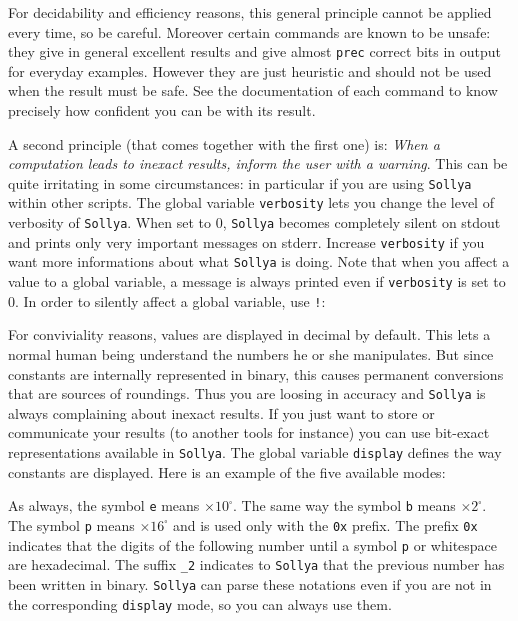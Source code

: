 \documentclass[a4paper]{article}
\newcommand{\com}[1]{\texttt{#1}}
\newcommand{\key}[1]{\texttt{#1}}
\newcommand{\sollya}{\texttt{Sollya}\xspace}
\begin{document}
For decidability and efficiency reasons, this general principle cannot be applied every time, so be careful. Moreover certain commands are known to be unsafe: they give in general excellent results and give almost \key{prec} correct bits in output for everyday examples. However they are just heuristic and should not be used when the result must be safe. See the documentation of each command to know precisely how confident you can be with its result.

A second principle (that comes together with the first one) is: \emph{When a computation leads to inexact results, inform the user with a warning}. This can be quite irritating in some circumstances: in particular if you are using \sollya within other scripts. The global variable \key{verbosity} lets you change the level of verbosity of \sollya. When set to $0$, \sollya becomes completely silent on stdout and prints only very important messages on stderr. Increase \key{verbosity} if you want more informations about what \sollya is doing. Note that when you affect a value to a global variable, a message is always printed even if \com{verbosity} is set to $0$. In order to silently affect a global variable, use \texttt{!}:



For conviviality reasons, values are displayed in decimal by default. This lets a normal human being understand the numbers he or she manipulates. But since constants are internally represented in binary, this causes permanent conversions that are sources of roundings. Thus you are loosing in accuracy and \sollya is always complaining about inexact results. If you just want to store or communicate your results (to another tools for instance) you can use bit-exact representations available in \sollya. The global variable \key{display} defines the way constants are displayed. Here is an example of the five available modes:



As always, the symbol \texttt{e} means $\times 10^\square $. The same way the symbol \texttt{b} means  $\times 2^\square $. The symbol \texttt{p} means $\times 16^\square$ and is used only with the \texttt{0x} prefix. The prefix \texttt{0x} indicates that the digits of the following number until 
a symbol \texttt{p} or whitespace are hexadecimal. The suffix \texttt{\_2} indicates to \sollya that the previous number has been written in binary. \sollya can parse these notations even if you are not in the corresponding \key{display} mode, so you can always use them.
\end{document}

